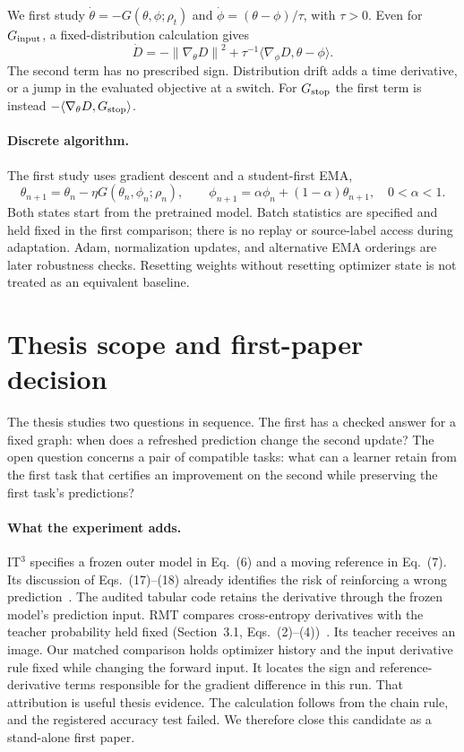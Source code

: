 \documentclass[11pt,a4paper]{article}
\newcommand{\norm}[1]{\left\lVert #1\right\rVert}
\begin{document}
We first study $\dot\theta=-G(\theta,\phi;\rho_t)$ and
$\dot\phi=(\theta-\phi)/\tau$, with $\tau>0$. Even for $G_{\rm input}$,
a fixed-distribution calculation gives
\begin{equation}
 \dot D=-\norm{\nabla_\theta D}^2
 +\tau^{-1}\langle\nabla_\phi D,\theta-\phi\rangle.
 \label{eq:energy}
\end{equation}
The second term has no prescribed sign. Distribution drift adds a time
derivative, or a jump in the evaluated objective at a switch. For
$G_{\rm stop}$ the first term is instead
$-\langle\nabla_\theta D,G_{\rm stop}\rangle$.

\paragraph{Discrete algorithm.}
The first study uses gradient descent and a student-first EMA,
\begin{equation}
 \theta_{n+1}=\theta_n-\eta G(\theta_n,\phi_n;\rho_n),\qquad
 \phi_{n+1}=\alpha\phi_n+(1-\alpha)\theta_{n+1},\quad 0<\alpha<1.
 \label{eq:discrete}
\end{equation}
Both states start from the pretrained model. Batch statistics are specified
and held fixed in the first comparison; there is no replay or source-label
access during adaptation. Adam, normalization updates, and alternative EMA
orderings are later robustness checks. Resetting weights without resetting
optimizer state is not treated as an equivalent baseline.

\section{Thesis scope and first-paper decision}
The thesis studies two questions in sequence. The first has a checked
answer for a fixed graph: when does a refreshed prediction change the
second update? The open question concerns a pair of compatible tasks:
what can a learner retain from the first task that certifies an improvement
on the second while preserving the first task's predictions?

\paragraph{What the experiment adds.}
IT$^3$ specifies a frozen outer model in Eq.~(6) and a moving reference in
Eq.~(7). Its discussion of Eqs.~(17)--(18) already identifies the risk of
reinforcing a wrong prediction~\cite{it3}. The audited tabular code retains
the derivative through the frozen model's prediction input. RMT compares
cross-entropy derivatives with the teacher probability held fixed
(Section~3.1, Eqs.~(2)--(4))~\cite{rmt}. Its teacher receives an image.
Our matched comparison holds optimizer history and the input derivative
rule fixed while changing the forward input. It locates the sign and
reference-derivative terms responsible for the gradient difference in
this run. That attribution is useful thesis evidence. The calculation
follows from the chain rule, and the registered accuracy test failed.
We therefore close this candidate as a stand-alone first paper.
\end{document}
